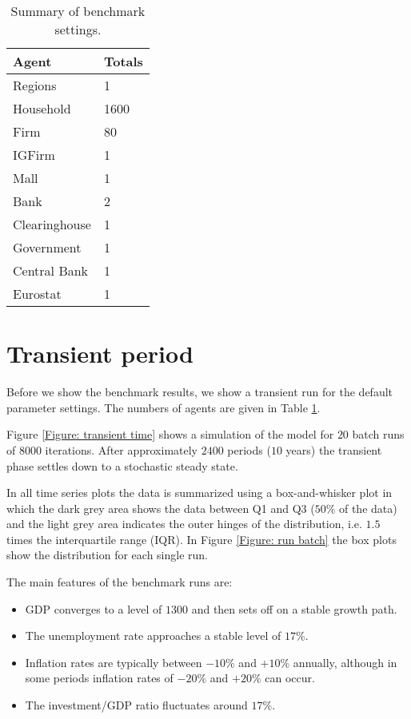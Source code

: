 \begin{table}[tbp]
\caption{Summary of benchmark settings.}
\label{Table: Benchmark Settings}\centering
\begin{tabular}{ll}
\hline\hline
Agent           & Totals\\
\hline
Regions         & 1\\
\hline
Household       & 1600\\
Firm            & 80\\
IGFirm          & 1\\
Mall            & 1\\
Bank            & 2\\
Clearinghouse   & 1\\
Government      & 1\\
Central Bank    & 1\\
Eurostat        & 1\\
\hline
\end{tabular}%
\end{table}


\section{Transient period}
Before we show the benchmark results, we show a transient run for the default parameter settings.
The numbers of agents are given in Table \ref{Table: Benchmark Settings}.

Figure \ref{Figure: transient time} shows a simulation of the model for $20$ batch runs of $8000$ iterations.
After approximately $2400$ periods ($10$ years) the transient phase settles down to a stochastic steady state.

In all time series plots the data is summarized using a box-and-whisker plot in which the dark grey area shows the data between Q1 and Q3 ($50\%$ of the data) and
 the light grey area indicates the outer hinges of the distribution, i.e. $1.5$ times the interquartile range (IQR).
In Figure \ref{Figure: run batch} the box plots show the distribution for each single run.

\bigskip
The main features of the benchmark runs are:
\begin{itemize}
\item GDP converges to a level of $1300$ and then sets off on a stable growth path.
\item The unemployment rate approaches a stable level of $17\%$.
\item Inflation rates are typically between $-10\%$ and $+10\%$ annually,
although in some periods inflation rates of $-20\%$ and $+20\%$ can occur.
\item The investment/GDP ratio fluctuates around $17\%$.
\end{itemize}

